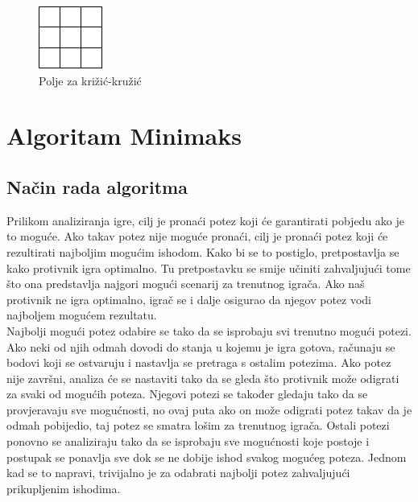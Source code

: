 \documentclass[times, utf8, seminar, numeric, tikz]{fer}
\begin{document}
\begin{figure}[h] 
	\centering
	\includegraphics[width=0.185\linewidth]{Samples/emptyField.pdf}
	\caption{Polje za križić-kružić}
	\label{fig:tttPolje}
\end{figure}  

\chapter{Algoritam Minimaks}
\section{Način rada algoritma}
Prilikom analiziranja igre, cilj je pronaći potez koji će garantirati pobjedu ako je to moguće. Ako takav potez nije moguće pronaći, cilj je pronaći potez koji će rezultirati najboljim mogućim ishodom. Kako bi se to postiglo, pretpostavlja se kako protivnik igra optimalno. Tu pretpostavku se smije učiniti zahvaljujući tome što ona predstavlja najgori mogući scenarij za trenutnog igrača. Ako naš protivnik ne igra optimalno, igrač se i dalje osigurao da njegov potez vodi najboljem mogućem rezultatu.\\

Najbolji mogući potez odabire se tako da se isprobaju svi trenutno mogući potezi. Ako neki od njih odmah dovodi do stanja u kojemu je igra gotova, računaju se bodovi koji se ostvaruju i nastavlja se pretraga s ostalim potezima. Ako potez nije završni, analiza će se nastaviti tako da se gleda što protivnik može odigrati za svaki od mogućih poteza. Njegovi potezi se također gledaju tako da se provjeravaju sve mogućnosti, no ovaj puta ako on može odigrati potez takav da je odmah pobijedio, taj potez se smatra lošim za trenutnog igrača. Ostali potezi ponovno se analiziraju tako da se isprobaju sve mogućnosti koje postoje i postupak se ponavlja sve dok se ne dobije ishod svakog mogućeg poteza. Jednom kad se to napravi, trivijalno je za odabrati najbolji potez zahvaljujući prikupljenim ishodima.\\
\end{document}
